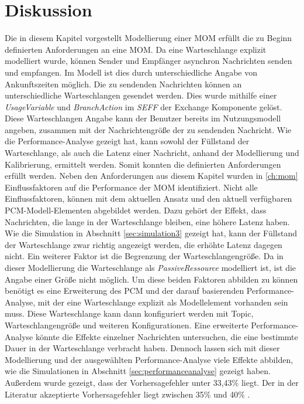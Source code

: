 \section{Diskussion}
Die in diesem Kapitel vorgestellt Modellierung einer MOM erfüllt die zu Beginn definierten Anforderungen an eine MOM. Da eine Warteschlange explizit modelliert wurde, können Sender und Empfänger asynchron Nachrichten senden und empfangen. Im Modell ist dies durch unterschiedliche Angabe von Ankunftszeiten möglich. Die zu sendenden Nachrichten können an unterschiedliche Warteschlangen gesendet werden. Dies wurde mithilfe einer \emph{UsageVariable} und \emph{BranchAction} im \emph{SEFF} der Exchange Komponente gelöst. Diese Warteschlangen Angabe kann der Benutzer bereits im Nutzungsmodell angeben, zusammen mit der Nachrichtengröße der zu sendenden Nachricht. Wie die Performance-Analyse gezeigt hat, kann sowohl der Füllstand der Warteschlange, als auch die Latenz einer Nachricht, anhand der Modellierung und Kalibrierung, ermittelt werden. Somit konnten die definierten Anforderungen erfüllt werden. Neben den Anforderungen aus diesem Kapitel wurden in \autoref{ch:mom} Einflussfaktoren auf die Performance der MOM identifiziert. Nicht alle Einflussfaktoren, können mit dem aktuellen Ansatz und den aktuell verfügbaren PCM-Modell-Elementen  abgebildet werden. Dazu gehört der Effekt, dass Nachrichten, die lange in der Warteschlange bleiben, eine höhere Latenz haben. Wie die Simulation in Abschnitt \ref{sec:simulation3} gezeigt hat, kann der Füllstand der Warteschlange zwar richtig angezeigt werden, die erhöhte Latenz dagegen nicht. Ein weiterer Faktor ist die Begrenzung der Warteschlangengröße. Da in dieser Modellierung die Warteschlange als \emph{PassiveRessource} modelliert ist, ist die Angabe einer Größe nicht möglich. Um diese beiden Faktoren abbilden zu können benötigt es eine Erweiterung des PCM und der darauf basierenden Performance-Analyse, mit der eine Warteschlange explizit als Modellelement vorhanden sein muss. Diese Warteschlange kann dann konfiguriert werden mit Topic, Warteschlangengröße und weiteren Konfigurationen. Eine erweiterte Performance-Analyse könnte die Effekte einzelner Nachrichten untersuchen, die eine bestimmte Dauer in der Warteschlange verbracht haben. Dennoch lassen sich mit dieser Modellierung und der ausgewählten Performance-Analyse viele Effekte abbilden, wie die Simulationen in Abschnitt \ref{sec:performanceanalyse} gezeigt haben. Außerdem wurde gezeigt, dass der Vorhersagefehler unter 33,43\% liegt. Der in der Literatur akzeptierte Vorhersagefehler liegt zwischen 35\% und 40\% \cite{error}. \par

